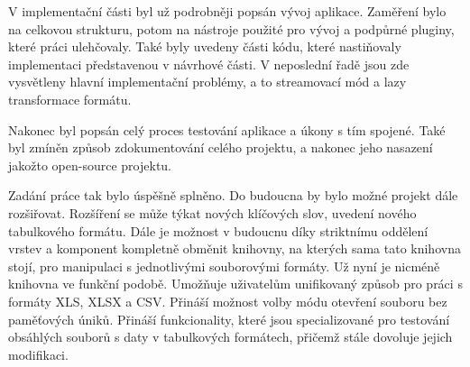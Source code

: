 V implementační části byl už podrobněji popsán vývoj aplikace. Zaměření bylo na celkovou strukturu, potom na nástroje použité pro vývoj a podpůrné pluginy, které práci ulehčovaly. Také byly uvedeny části kódu, které nastiňovaly implementaci představenou v návrhové části. V neposlední řadě jsou zde vysvětleny hlavní implementační problémy, a to streamovací mód a lazy transformace formátu.

Nakonec byl popsán celý proces testování aplikace a úkony s tím spojené. Také byl zmíněn způsob zdokumentování celého projektu, a nakonec jeho nasazení jakožto open-source projektu.

Zadání práce tak bylo úspěšně splněno. Do budoucna by bylo možné projekt dále rozšiřovat. Rozšíření se může týkat nových klíčových slov, uvedení nového tabulkového formátu. Dále je možnost v budoucnu díky striktnímu oddělení vrstev a komponent kompletně obměnit knihovny, na kterých sama tato knihovna stojí, pro manipulaci s jednotlivými souborovými formáty. Už nyní je nicméně knihovna ve funkční podobě. Umožňuje uživatelům unifikovaný způsob pro práci s formáty XLS, XLSX a CSV. Přináší možnost volby módu otevření souboru bez paměťových úniků. Přináší funkcionality, které jsou specializované pro testování obsáhlých souborů s daty v tabulkových formátech, přičemž stále dovoluje jejich modifikaci.
